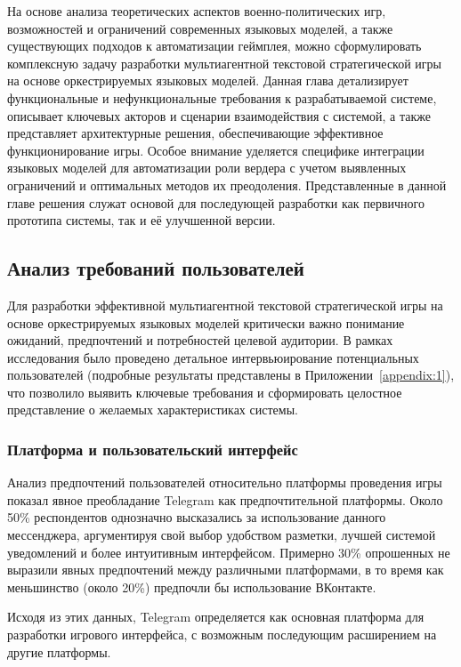 На основе анализа теоретических аспектов военно-политических игр, возможностей и ограничений современных языковых моделей, а также существующих подходов к автоматизации геймплея, можно сформулировать комплексную задачу разработки мультиагентной текстовой стратегической игры на основе оркестрируемых языковых моделей. Данная глава детализирует функциональные и нефункциональные требования к разрабатываемой системе, описывает ключевых акторов и сценарии взаимодействия с системой, а также представляет архитектурные решения, обеспечивающие эффективное функционирование игры. Особое внимание уделяется специфике интеграции языковых моделей для автоматизации роли вердера с учетом выявленных ограничений и оптимальных методов их преодоления. Представленные в данной главе решения служат основой для последующей разработки как первичного прототипа системы, так и её улучшенной версии.
\subsection{Анализ требований пользователей}

Для разработки эффективной мультиагентной текстовой стратегической игры на основе оркестрируемых языковых моделей критически важно понимание ожиданий, предпочтений и потребностей целевой аудитории. В рамках исследования было проведено детальное интервьюирование потенциальных пользователей (подробные результаты представлены в Приложении~\ref{appendix:1}), что позволило выявить ключевые требования и сформировать целостное представление о желаемых характеристиках системы.

\subsubsection{Платформа и пользовательский интерфейс}

Анализ предпочтений пользователей относительно платформы проведения игры показал явное преобладание Telegram как предпочтительной платформы. Около 50\% респондентов однозначно высказались за использование данного мессенджера, аргументируя свой выбор удобством разметки, лучшей системой уведомлений и более интуитивным интерфейсом. Примерно 30\% опрошенных не выразили явных предпочтений между различными платформами, в то время как меньшинство (около 20\%) предпочли бы использование ВКонтакте.

Исходя из этих данных, Telegram определяется как основная платформа для разработки игрового интерфейса, с возможным последующим расширением на другие платформы.


